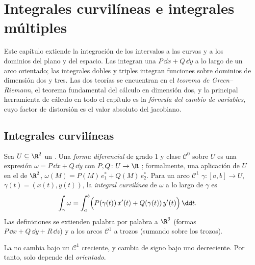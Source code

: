 \chapter{Integrales curvilíneas e integrales múltiples}\label{ch:b2:multint}

Este capítulo extiende la integración de los intervalos a las curvas y
a los dominios del plano y del espacio. Las 
integran una \emph{} $P\,\dd x + Q\,\dd y$ a lo largo
de un arco orientado; las integrales dobles y triples integran
funciones sobre dominios de dimensión dos y tres. Las dos teorías se
encuentran en el \emph{teorema de Green--Riemann}, el teorema
fundamental del cálculo en dimensión dos, y la principal herramienta de
cálculo en todo el capítulo es la \emph{fórmula del cambio de
variables}, cuyo factor de distorsión es el valor absoluto del
 jacobiano.

\section{Integrales curvilíneas}

\begin{definition}\label{def:b2:multint:lineint}
Sea $U \subseteq \R^2$ un . Una \emph{forma
diferencial} de grado $1$ y clase
$\mathcal{C}^0$ sobre $U$ es una expresión $\omega = P\,\dd x +
Q\,\dd y$ con $P, Q \colon U \to \R$ ; formalmente, una
aplicación  de $U$ en el  de $\R^2$, $\omega(M) =
P(M)\,e_1^* + Q(M)\,e_2^*$. Para un arco $\mathcal{C}^1$ $\gamma
\colon [a, b] \to U$, $\gamma(t) = (x(t), y(t))$, la \emph{integral
curvilínea} de $\omega$ a lo largo de
$\gamma$ es
\[
\int_\gamma \omega
= \int_a^b \Bigl(P(\gamma(t))\,x'(t)
+ Q(\gamma(t))\,y'(t)\Bigr)\,\dd t .
\]
Las definiciones se extienden palabra por palabra a $\R^3$ (formas
$P\,\dd x + Q\,\dd y + R\,\dd z$) y a los arcos $\mathcal{C}^1$ a
trozos (sumando sobre los trozos).
\end{definition}

\begin{proposition}\label{prop:b2:multint:lineinv}
La  no cambia bajo un 
$\mathcal{C}^1$ creciente, y cambia de signo bajo uno decreciente.
Por tanto, solo depende del  \emph{orientado}.
\end{proposition}

